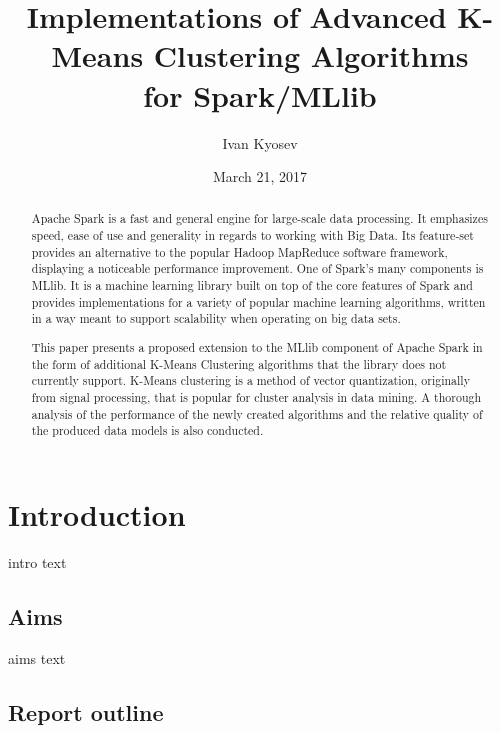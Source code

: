 \documentclass{l4proj}
\begin{document}
\title{Implementations of Advanced K-Means Clustering Algorithms \\ for Spark/MLlib}
\author{Ivan Kyosev}
\date{March 21, 2017}
\maketitle

\begin{abstract}
Apache Spark is a fast and general engine for large-scale data processing. It emphasizes speed, ease of use and generality in regards to working with Big Data. Its feature-set provides an alternative to the popular Hadoop MapReduce software framework, displaying a noticeable performance improvement. One of Spark's many components is MLlib. It is a machine learning library built on top of the core features of Spark and provides implementations for a variety of popular machine learning algorithms, written in a way meant to support scalability when operating on big data sets.

This paper presents a proposed extension to the MLlib component of Apache Spark in the form of additional K-Means Clustering algorithms that the library does not currently support. K-Means clustering is a method of vector quantization, originally from signal processing, that is popular for cluster analysis in data mining. A thorough analysis of the performance of the newly created algorithms and the relative quality of the produced data models is also conducted.
\end{abstract}

\educationalconsent

\tableofcontents

\chapter{Introduction}
\label{intro}

intro text

\section{Aims}

aims text

\section{Report outline}
\end{document}

